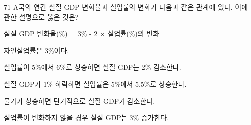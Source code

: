 \begin{question}{71}
A국의 연간 실질 GDP 변화율과 실업률의 변화가 다음과 같은 관계에 있다. 이에 관한 설명으로 옳은 것은?
\begin{framedtext}
실질 GDP 변화율(\%) = 3\% - 2 × 실업률(\%)의 변화
\end{framedtext}
\begin{choices}
  \item 자연실업률은 3\%이다.
  \item 실업률이 5\%에서 6\%로 상승하면 실질 GDP는 2\% 감소한다.
  \item 실질 GDP가 1\% 하락하면 실업률은 5\%에서 5.5\%로 상승한다.
  \item 물가가 상승하면 단기적으로 실질 GDP가 감소한다.
  \item 실업률이 변화하지 않을 경우 실질 GDP는 3\% 증가한다.
\end{choices}
\end{question}
